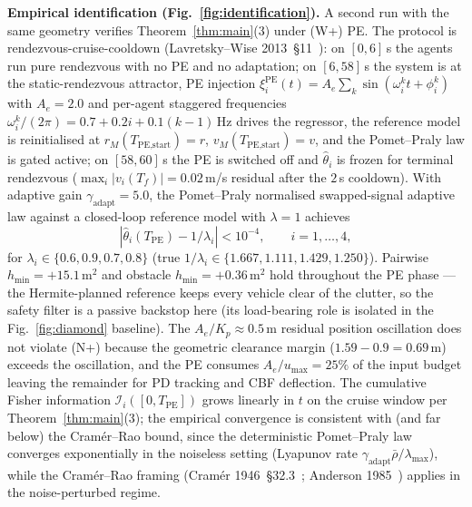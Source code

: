 \documentclass[letterpaper,10pt,conference]{IEEEtran}
\newcommand{\thethat}{\hat\theta}
\newcommand{\rhobar}{\bar\rho}
\begin{document}
\textbf{Empirical identification (Fig.~\ref{fig:identification}).} A second run with the same geometry verifies Theorem~\ref{thm:main}(3) under (W+) PE. The protocol is rendezvous-cruise-cooldown (Lavretsky--Wise 2013~\S 11~\cite{lavretskyWise2013}): on $[0, 6]$\,s the agents run pure rendezvous with no PE and no adaptation; on $[6, 58]$\,s the system is at the static-rendezvous attractor, PE injection $\xi_i^{\text{PE}}(t) = A_e \sum_k \sin(\omega_i^k t + \phi_i^k)$ with $A_e = 2.0$ and per-agent staggered frequencies $\omega_i^k/(2\pi) = 0.7 + 0.2 i + 0.1(k{-}1)$\,Hz drives the regressor, the reference model is reinitialised at $r_M(T_{\text{PE,start}}) \!=\! r$, $v_M(T_{\text{PE,start}}) \!=\! v$, and the Pomet--Praly law is gated active; on $[58, 60]$\,s the PE is switched off and $\thethat_i$ is frozen for terminal rendezvous ($\max_i|v_i(T_f)| = 0.02$\,m/s residual after the $2$\,s cooldown). With adaptive gain $\gamma_{\text{adapt}} = 5.0$, the Pomet--Praly normalised swapped-signal adaptive law against a closed-loop reference model with $\lambda = 1$ achieves
\[
|\thethat_i(T_{\text{PE}}) - 1/\lambda_i| < 10^{-4}, \qquad i = 1,\dots,4,
\]
for $\lambda_i \in \{0.6, 0.9, 0.7, 0.8\}$ (true $1/\lambda_i \in \{1.667, 1.111, 1.429, 1.250\}$). Pairwise $h_{\min} = +15.1$\,m$^2$ and obstacle $h_{\min} = +0.36$\,m$^2$ hold throughout the PE phase --- the Hermite-planned reference keeps every vehicle clear of the clutter, so the safety filter is a passive backstop here (its load-bearing role is isolated in the Fig.~\ref{fig:diamond} baseline). The $A_e/K_p \approx 0.5$\,m residual position oscillation does not violate (N+) because the geometric clearance margin ($1.59 - 0.9 = 0.69$\,m) exceeds the oscillation, and the PE consumes $A_e/u_{\max} = 25\%$ of the input budget leaving the remainder for PD tracking and CBF deflection. The cumulative Fisher information $\mathcal{I}_i([0, T_{\text{PE}}])$ grows linearly in $t$ on the cruise window per Theorem~\ref{thm:main}(3); the empirical convergence is consistent with (and far below) the Cram\'er--Rao bound, since the deterministic Pomet--Praly law converges exponentially in the noiseless setting (Lyapunov rate $\gamma_{\text{adapt}}\rhobar/\lambda_{\max}$), while the Cram\'er--Rao framing (Cram\'er 1946~\S 32.3~\cite{cramer1946}; Anderson 1985~\cite{anderson1985}) applies in the noise-perturbed regime.
\end{document}
